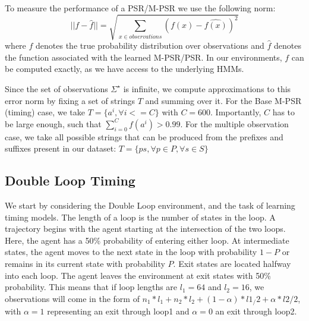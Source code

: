 

To measure the performance of a PSR/M-PSR we use the following norm:
\begin{equation*}
||f - \hat{f}|| = \sqrt{\sum_{x \in observations}(f(x) - \hat{f(x)})^2}
\end{equation*}
where $f$ denotes the true probability distribution over observations and $\hat{f}$ denotes the function associated with the learned M-PSR/PSR. In our environments, $f$ can be computed exactly, as we have access to the underlying HMMs.

Since the set of observations $\Sigma^{\star}$ is infinite, we compute approximations to this error norm by fixing a set of strings $T$ and summing over it. For the Base M-PSR (timing) case, we take $T = \{a^i, \forall i<=C\}$ with $C=600$. Importantly, $C$ has to be  large enough, such that $\sum_{i=0}^{C}f(a^i)>0.99$. For the multiple observation case, we take all possible strings that can be produced from the prefixes and suffixes present in our dataset: $T = \{ps, \forall p \in P, \forall s \in S\} $


\subsection{Double Loop Timing}

We start by considering the Double Loop environment, and the task of learning timing models. The length of a loop is the number of states in the loop. A trajectory begins with the agent starting at the intersection of the two loops. Here, the agent has a 50\% probability of entering either loop. At intermediate states, the agent moves to the next state in the loop with probability $1-P$ or remains in its current state with probability $P$. Exit states are located halfway into each loop. The agent leaves the environment at exit states with 50\% probability. This means that if loop lengths are $l_1=64$ and $l_2=16$, we observations will come in the form of $n_1*l_1+n_2*l_2+(1-\alpha)*l1_/2 + \alpha*l2/2$, with $\alpha=1$ representing an exit through loop1 and $\alpha=0$ an exit through loop2.

